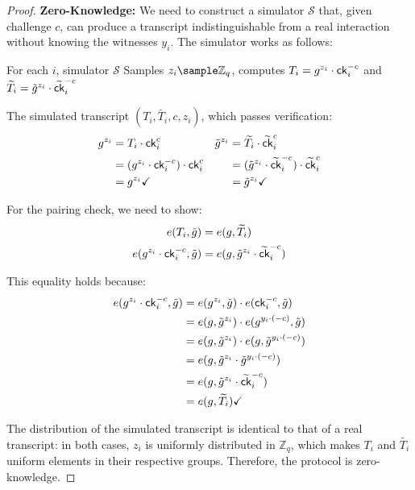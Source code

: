 \begin{proof}
    \item \textbf{Zero-Knowledge:} We need to construct a simulator $\mathcal{S}$ that, given challenge $c$, can produce a transcript indistinguishable from a real interaction without knowing the witnesses $y_i$. The simulator works as follows:

    For each $i$, simulator $\mathcal{S}$ Samples $z_i \sample \mathbb{Z}_q$, computes $T_i = g^{z_i} \cdot \mathsf{ck}_i^{-c}$ and $\widetilde{T_i} = \tilde{g}^{z_i} \cdot \widetilde{\mathsf{ck}}_i^{-c}$
    
    The simulated transcript $(T_i, \widetilde{T_i}, c, z_i)$, which passes verification:
    \begin{align*}
    g^{z_i} &= T_i \cdot \mathsf{ck}_i^c                &     \tilde{g}^{z_i} &= \widetilde{T_i} \cdot \widetilde{\mathsf{ck}}_i^c      \\
    &= (g^{z_i} \cdot \mathsf{ck}_i^{-c}) \cdot \mathsf{ck}_i^c &      &= (\tilde{g}^{z_i} \cdot \widetilde{\mathsf{ck}}_i^{-c}) \cdot \widetilde{\mathsf{ck}}_i^c     \\
    &= g^{z_i} \checkmark                       & &= \tilde{g}^{z_i} \checkmark
    \end{align*}
    
    For the pairing check, we need to show:
    \begin{align*}
    e(T_i, \tilde{g}) &= e(g, \widetilde{T_i}) \\
    e(g^{z_i} \cdot \mathsf{ck}_i^{-c}, \tilde{g}) &= e(g, \tilde{g}^{z_i} \cdot \widetilde{\mathsf{ck}}_i^{-c})
    \end{align*}
    
    This equality holds because:
    \begin{align*}
    e(g^{z_i} \cdot \mathsf{ck}_i^{-c}, \tilde{g}) &= e(g^{z_i}, \tilde{g}) \cdot e(\mathsf{ck}_i^{-c}, \tilde{g}) \\
    &= e(g, \tilde{g}^{z_i}) \cdot e(g^{y_i \cdot (-c)}, \tilde{g}) \\
    &= e(g, \tilde{g}^{z_i}) \cdot e(g, \tilde{g}^{y_i \cdot (-c)}) \\
    &= e(g, \tilde{g}^{z_i} \cdot \tilde{g}^{y_i \cdot (-c)}) \\
    &= e(g, \tilde{g}^{z_i} \cdot \widetilde{\mathsf{ck}}_i^{-c}) \\
    &= e(g, \widetilde{T_i}) \checkmark
    \end{align*}
    
    The distribution of the simulated transcript is identical to that of a real transcript: in both cases, $z_i$ is uniformly distributed in $\mathbb{Z}_q$, which makes $T_i$ and $\widetilde{T_i}$ uniform elements in their respective groups. Therefore, the protocol is zero-knowledge.
    \end{proof}





















